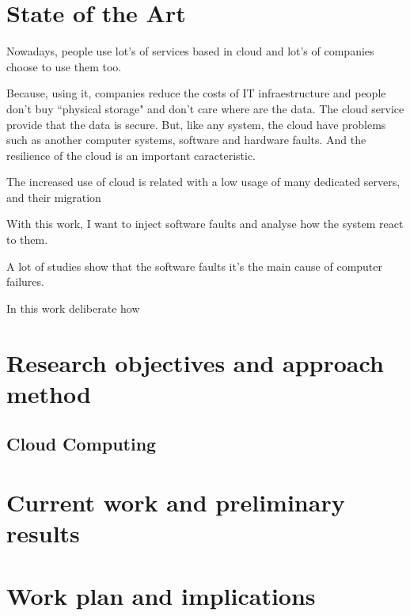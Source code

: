 \newpage
\section{State of the Art}

Nowadays, people use lot's of services based in cloud and lot's of companies choose to use them too.

Because, using it, companies reduce the costs of IT infraestructure and people don't buy ``physical storage" and don't care where are the data. The cloud service provide that the data is secure.
But, like any system, the cloud have problems such as another computer systems, software and hardware faults. And the resilience of the cloud is an important caracteristic.

The increased use of cloud is related with a low usage of many dedicated servers, and their migration 



With this work, I want to inject software faults and analyse how the system react to them.

A lot of studies show that the software faults it's the main cause of computer failures.

In this work
deliberate how 

\cite{duraes2006emulation}
\cite{wolter2012resilience}
\cite{avizzienisbasic}



\newpage
\section{Research objectives and approach method}

\subsection{Cloud Computing}

\newpage
\section{Current work and preliminary results}

\newpage
\section{Work plan and implications}